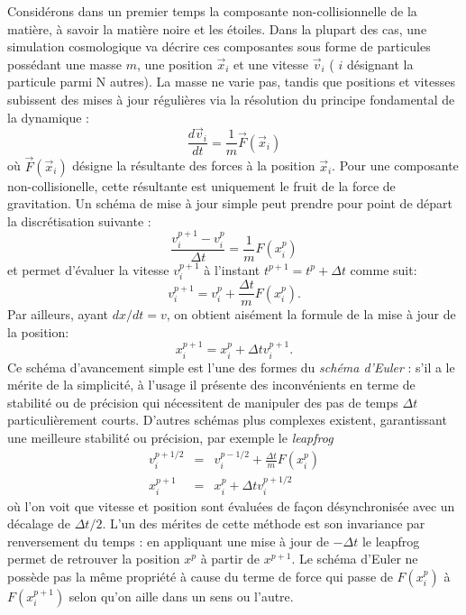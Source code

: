 Considérons dans un premier temps la composante non-collisionnelle de la matière, à savoir la matière noire et les étoiles. Dans la plupart des cas, une simulation cosmologique va décrire ces composantes sous forme de particules possédant une masse $m$, une position $\vec x_i$ et une vitesse $\vec v_i$ ( $i$ désignant la particule parmi N autres). La masse ne varie pas, tandis que positions et vitesses subissent des mises à jour régulières via la résolution du principe fondamental de la dynamique :
\begin{equation}
\frac{d \vec v_i}{dt}=\frac{1}{m} \vec{F}(\vec x_i)
\end{equation}
où $\vec{F}(\vec x_i)$ désigne la résultante des forces à la position $\vec x_i$. Pour une composante non-collisionelle, cette résultante est uniquement le fruit de la force de gravitation. Un schéma de mise à jour simple peut prendre pour point de départ la discrétisation suivante :
\begin{equation}
\frac{v_i^{p+1}-v_i^{p}}{\Delta t}=\frac{1}{m} {F}(x_i^p)
\end{equation}
et permet d'évaluer la vitesse $v_i^{p+1}$ à l'instant $t^{p+1}=t^p+\Delta t$ comme suit:
\begin{equation}
v_i^{p+1}=v_i^{p}+\frac{\Delta t}{m} {F}(x_i^p).
\end{equation}
Par ailleurs, ayant $dx/dt=v$, on obtient aisément la formule de la mise à jour de la position:
\begin{equation}
x^{p+1}_i=x^{p}_i+\Delta t v_i^{p+1}.
\end{equation}
Ce schéma d'avancement simple est l'une des formes du \textit{schéma d'Euler} : s'il a le mérite de la simplicité, à l'usage il présente des inconvénients en terme de stabilité ou de précision qui nécessitent de manipuler des pas de temps $\Delta t$ particulièrement courts. D'autres schémas plus complexes existent, garantissant une meilleure stabilité ou précision, par exemple le \textit{leapfrog}
\begin{eqnarray}
v_i^{p+1/2}&=&v_i^{p-1/2}+\frac{\Delta t}{m} {F}(x_i^p)\\
x^{p+1}_i&=&x^{p}_i+\Delta t v_i^{p+1/2}
\end{eqnarray}
où l'on voit que vitesse et position sont évaluées de façon désynchronisée avec un décalage de $\Delta t/2$. L'un des mérites de cette méthode est son invariance par renversement du temps  : en appliquant une mise à jour de $-\Delta t$ le leapfrog permet de retrouver la position $x^p$ à partir de $x^{p+1}$. Le schéma d'Euler ne possède pas la même propriété à cause du terme de force qui passe de ${F}(x_i^p)$ à  ${F}(x_i^{p+1})$ selon qu'on aille dans un sens ou l'autre. 


